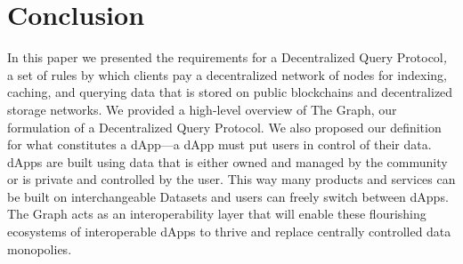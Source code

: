 \documentclass[12pt]{article}
\begin{document}
\section{Conclusion}
In this paper we presented the requirements for a Decentralized Query Protocol\textit{,} a set of rules by which clients pay a decentralized network of nodes for indexing, caching, and querying data that is stored on public blockchains and decentralized storage networks. We provided a high-level overview of The Graph, our formulation of a Decentralized Query Protocol. We also proposed our definition for what constitutes a dApp---a dApp must put users in control of their data. dApps are built using data that is either owned and managed by the community or is private and controlled by the user. This way many products and services can be built on interchangeable Datasets and users can freely switch between dApps. The Graph acts as an interoperability layer that will enable these flourishing ecosystems of interoperable dApps to thrive and replace centrally controlled data monopolies.
\end{document}
